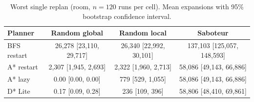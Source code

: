 \begin{table}[!t]
\centering
\footnotesize
\caption{Worst single replan (room, $n=120$ runs per cell). Mean expansions with 95\% bootstrap confidence interval.}
\label{tab:hitch-room}
\begin{tabular}{lccc}
\toprule
Planner & Random global & Random local & Saboteur \\
\midrule
BFS restart & 26,278 [23,110, 29,717] & 26,340 [22,992, 30,101] & 137,103 [125,057, 148,593] \\
A* restart & 2,307 [1,945, 2,693] & 2,322 [1,960, 2,713] & 58,086 [49,143, 66,886] \\
A* lazy & 0.00 [0.00, 0.00] & 779 [529, 1,055] & 58,086 [49,143, 66,886] \\
D* Lite & 0.17 [0.09, 0.28] & 236 [109, 396] & 58,806 [48,410, 69,861] \\
\bottomrule
\end{tabular}
\end{table}
